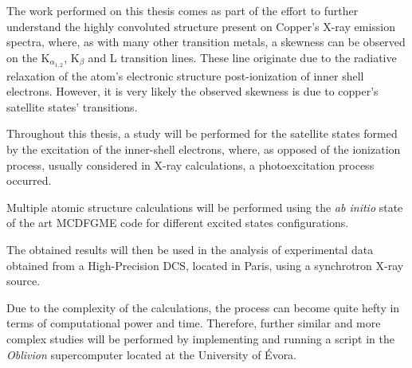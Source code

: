 
%

The work performed on this thesis comes as part of the effort to further understand the highly convoluted structure present on Copper's X-ray emission spectra, where, as with many other transition metals, a skewness can be observed on the K$_{\alpha_{1,2}}$, K$_{\beta}$ and L transition lines. These line originate due to the radiative relaxation of the atom's electronic structure post-ionization of inner shell electrons.
However, it is very likely the observed skewness is due to copper's satellite states' transitions.

Throughout this thesis, a study will be performed for the satellite states formed by the excitation of the inner-shell electrons, where, as opposed of the ionization process, usually considered in X-ray calculations, a photoexcitation process occurred.

 Multiple atomic structure calculations will be performed using the \textit{ab initio} state of the art \gls{MCDFGME} code for different excited states configurations.

 The obtained results will then be used in the analysis of experimental data obtained from a High-Precision \gls{DCS}, located in Paris, using a synchrotron X-ray source.

Due to the complexity of the calculations, the process can become quite hefty in terms of computational power and time. Therefore, further similar and more complex studies will be performed by implementing and running a script in the \textit{Oblivion} supercomputer located at the University of Évora.

